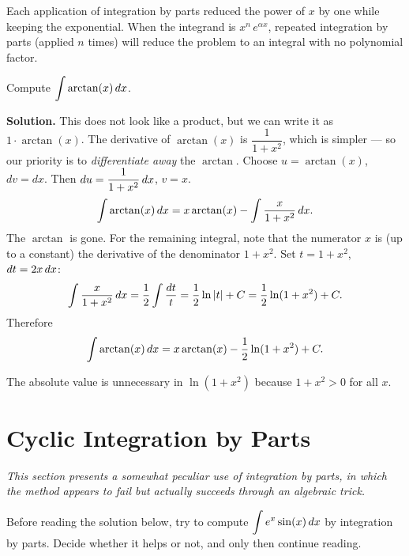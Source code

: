 \begin{remark}
Each application of integration by parts reduced the power of $x$ by one while keeping the exponential.  When the integrand is $x^{n}\,e^{\alpha x}$, repeated integration by parts (applied $n$ times) will reduce the problem to an integral with no polynomial factor.
\end{remark}

\begin{example}
\label{ex:9-11}
Compute $\displaystyle\int \arctan(x)\,dx$.

\textbf{Solution.}  This does not look like a product, but we can write it as $1 \cdot \arctan(x)$.  The derivative of $\arctan(x)$ is $\dfrac{1}{1+x^{2}}$, which is simpler --- so our priority is to \textit{differentiate away} the $\arctan$.  Choose $u = \arctan(x)$, $dv = dx$.  Then $du = \dfrac{1}{1+x^{2}}\,dx$, $v = x$.
\[
  \int \arctan(x)\,dx = x\arctan(x) - \int \frac{x}{1+x^{2}}\,dx.
\]
The $\arctan$ is gone.  For the remaining integral, note that the numerator $x$ is (up to a constant) the derivative of the denominator $1 + x^{2}$.  Set $t = 1 + x^{2}$, $dt = 2x\,dx$:
\[
  \int \frac{x}{1+x^{2}}\,dx = \frac{1}{2}\int \frac{dt}{t} = \frac{1}{2}\ln\left\lvert t \right\rvert + C = \frac{1}{2}\ln(1+x^{2}) + C.
\]
Therefore
\[
  \int \arctan(x)\,dx = x\arctan(x) - \frac{1}{2}\ln(1+x^{2}) + C.
\]
\end{example}

\begin{remark}
The absolute value is unnecessary in $\ln(1+x^{2})$ because $1+x^{2} > 0$ for all $x$.
\end{remark}

\section{Cyclic Integration by Parts}
\label{sec:9.6}

\textit{This section presents a somewhat peculiar use of integration by parts, in which the method appears to fail but actually succeeds through an algebraic trick.}

\begin{remark}
Before reading the solution below, try to compute $\displaystyle\int e^{x}\sin(x)\,dx$ by integration by parts.  Decide whether it helps or not, and only then continue reading.
\end{remark}

